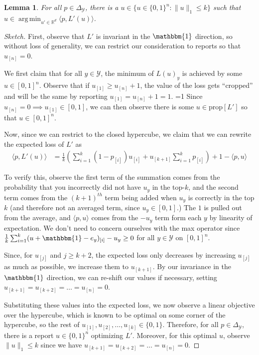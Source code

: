 \documentclass[12pt]{article}
\newcommand{\Comments}{1}
\newcommand{\mytodo}[2]{\ifnum\Comments=1%
  \todo[linecolor=#1!80!black,backgroundcolor=#1,bordercolor=#1!80!black]{#2}\fi}
\newcommand{\jessiet}[1]{\mytodo{purple!20!white}{JF: #1}}
\newcommand{\reals}{\mathbb{R}}
\newcommand{\prop}[1]{\mathrm{prop}[#1]}
\newcommand{\simplex}{\Delta_\Y}
\newcommand{\Y}{\mathcal{Y}}
\newcommand{\inprod}[2]{\langle #1, #2 \rangle}%
\newcommand{\ones}{\mathbbm{1}}
\DeclareMathOperator*{\argmin}{arg\,min}
\newtheorem{lemma}{Lemma}
\begin{document}
\begin{lemma}\label{lem:top-k-optimal-corners}
	For all $p \in \simplex$, there is a $u \in \{ u \in \{0,1\}^n : \|u\|_1 \leq k\}$ such that $u \in \argmin_{u' \in \reals^d} \inprod{p}{L'(u)}$.
\end{lemma}
\begin{proof}[Sketch]
  First, observe that $L'$ is invariant in the $\ones$ direction, so without loss of generality, we can restrict our consideration to reports so that $u_{[n]} = 0$.
  
  We first claim that for all $y \in \Y$, the minimum of $L(u)_y$ is achieved by some $u \in [0,1]^n$.
  Observe that if $u_{[1]} \geq u_{[n]} + 1$, the value of the loss gets ``cropped'' and will be the same by reporting $u_{[1]} = u_{[n]} + 1 = 1$. \jessiet{Flesh this out later.}
  Since $u_{[n]} = 0 \implies u_{[1]} \in [0,1]$, we can then observe there is some $u \in \prop{L'}$ so that $u \in [0,1]^n$.
    
  Now, since we can restrict to the closed hypercube, we claim that we can rewrite the expected loss of $L'$ as 
  \begin{align*}
  	\inprod{p}{L'(u)} &= \frac{1}{k} \left( \sum_{i=1}^k (1 - p_{[i]}) u_{[i]} + u_{[k+1]} \sum_{i=1}^k p_{[i]} \right) + 1 - \inprod{p}{u}
  \end{align*}
  
  To verify this, observe the first term of the summation comes from the probability that you incorrectly did not have $u_y$ in the top-$k$, and the second term comes from the $(k+1)^{th}$ term being added when $u_y$ is correctly in the top $k$ (and therefore not an averaged term, since $u_y \in [0,1]$.) 
  The $1$ is pulled out from the average, and $\inprod{p}{u}$ comes from the $-u_y$ term form each $y$ by linearity of expectation.
  We don't need to concern ourselves with the max operator since $\frac{1}{k} \sum_{i=1}^k (u + \ones - e_y)_{[i]} - u_y \geq 0$ for all $y \in \Y$ on $[0,1]^n$.
  
  Since, for $u_{[j]}$ and $j \geq k+2$, the expected loss only decreases by increasing $u_{[j]}$ as much as possible, we increase them to $u_{[k+1]}$.
  By our invariance in the $\ones$ direction, we can re-shift our values if necessary, setting $u_{[k+1]} = u_{[k+2]} = \ldots = u_{[n]} = 0$.
  
  Substituting these values into the expected loss, we now observe a linear objective over the hypercube, which is known to be optimal on some corner of the hypercube, so the rest of $u_{[1]}, u_{[2]}, \ldots, u_{[k]} \in \{0,1\}$.
  Therefore, for all $p \in \simplex$, there is a report $u \in \{0,1\}^n$ optimizing $L'$.
  Moreover, for this optimal $u$, observe $\|u\|_{1} \leq k$ since we have $u_{[k+1]} = u_{[k+2]} = \ldots = u_{[n]} = 0$.
\end{proof}
\end{document}
